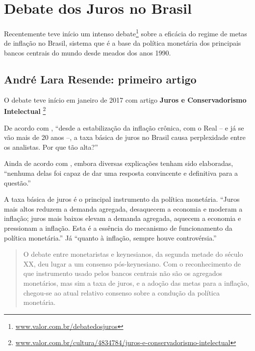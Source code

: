 \documentclass[]{article}
\let\rmarkdownfootnote\footnote%
\def\footnote{\protect\rmarkdownfootnote}
\begin{document}
\section{Debate dos Juros no Brasil}\label{debate-dos-juros-no-brasil}

Recentemente teve início um intenso debate\footnote{\href{http://www.valor.com.br/debatedosjuros}{www.valor.com.br/debatedosjuros}}
sobre a eficácia do regime de metas de inflação no Brasil, sistema que é
a base da política monetária dos principais bancos centrais do mundo
desde meados dos anos 1990.

\subsection{André Lara Resende: primeiro
artigo}\label{andre-lara-resende-primeiro-artigo}

O debate teve início em janeiro de 2017 com artigo \textbf{Juros e
Conservadorismo Intelectual} \cite{resende1}\footnote{\href{http://www.valor.com.br/cultura/4834784/juros-e-conservadorismo-intelectual}{www.valor.com.br/cultura/4834784/juros-e-conservadorismo-intelectual}}

De acordo com , ``desde a estabilização da
inflação crônica, com o Real -- e já se vão mais de 20 anos --, a taxa
básica de juros no Brasil causa perplexidade entre os analistas. Por que
tão alta?''

Ainda de acordo com , embora diversas
explicações tenham sido elaboradas, ``nenhuma delas foi capaz de dar uma
resposta convincente e definitiva para a questão.''

A taxa básica de juros é o principal instrumento da política monetária.
``Juros mais altos reduzem a demanda agregada, desaquecem a economia e
moderam a inflação; juros mais baixos elevam a demanda agregada, aquecem
a economia e pressionam a inflação. Esta é a essência do mecanismo de
funcionamento da política monetária.'' Já ``quanto à inflação, sempre
houve controvérsia.''

\begin{quote}
O debate entre monetaristas e keynesianos, da segunda metade do século
XX, deu lugar a um consenso pós-keynesiano. Com o reconhecimento de que
instrumento usado pelos bancos centrais não são os agregados monetários,
mas sim a taxa de juros, e a adoção das metas para a inflação, chegou-se
ao atual relativo consenso sobre a condução da política monetária.
\end{quote}
\end{document}
